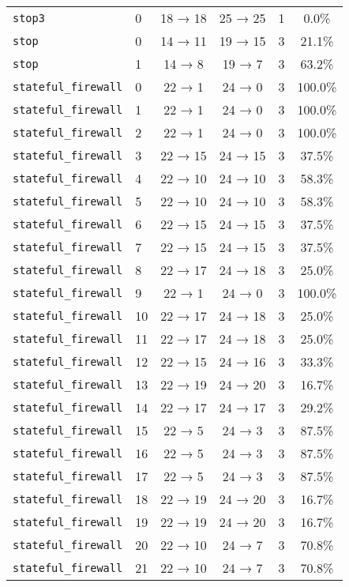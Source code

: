 \begin{tabular}{llcccc}
\texttt{stop3} & 0 & 18 → 18 & 25 → 25 & 1 & 0.0\% \\
\texttt{stop} & 0 & 14 → 11 & 19 → 15 & 3 & 21.1\% \\
\texttt{stop} & 1 & 14 → 8 & 19 → 7 & 3 & 63.2\% \\
\texttt{stateful_firewall} & 0 & 22 → 1 & 24 → 0 & 3 & 100.0\% \\
\texttt{stateful_firewall} & 1 & 22 → 1 & 24 → 0 & 3 & 100.0\% \\
\texttt{stateful_firewall} & 2 & 22 → 1 & 24 → 0 & 3 & 100.0\% \\
\texttt{stateful_firewall} & 3 & 22 → 15 & 24 → 15 & 3 & 37.5\% \\
\texttt{stateful_firewall} & 4 & 22 → 10 & 24 → 10 & 3 & 58.3\% \\
\texttt{stateful_firewall} & 5 & 22 → 10 & 24 → 10 & 3 & 58.3\% \\
\texttt{stateful_firewall} & 6 & 22 → 15 & 24 → 15 & 3 & 37.5\% \\
\texttt{stateful_firewall} & 7 & 22 → 15 & 24 → 15 & 3 & 37.5\% \\
\texttt{stateful_firewall} & 8 & 22 → 17 & 24 → 18 & 3 & 25.0\% \\
\texttt{stateful_firewall} & 9 & 22 → 1 & 24 → 0 & 3 & 100.0\% \\
\texttt{stateful_firewall} & 10 & 22 → 17 & 24 → 18 & 3 & 25.0\% \\
\texttt{stateful_firewall} & 11 & 22 → 17 & 24 → 18 & 3 & 25.0\% \\
\texttt{stateful_firewall} & 12 & 22 → 15 & 24 → 16 & 3 & 33.3\% \\
\texttt{stateful_firewall} & 13 & 22 → 19 & 24 → 20 & 3 & 16.7\% \\
\texttt{stateful_firewall} & 14 & 22 → 17 & 24 → 17 & 3 & 29.2\% \\
\texttt{stateful_firewall} & 15 & 22 → 5 & 24 → 3 & 3 & 87.5\% \\
\texttt{stateful_firewall} & 16 & 22 → 5 & 24 → 3 & 3 & 87.5\% \\
\texttt{stateful_firewall} & 17 & 22 → 5 & 24 → 3 & 3 & 87.5\% \\
\texttt{stateful_firewall} & 18 & 22 → 19 & 24 → 20 & 3 & 16.7\% \\
\texttt{stateful_firewall} & 19 & 22 → 19 & 24 → 20 & 3 & 16.7\% \\
\texttt{stateful_firewall} & 20 & 22 → 10 & 24 → 7 & 3 & 70.8\% \\
\texttt{stateful_firewall} & 21 & 22 → 10 & 24 → 7 & 3 & 70.8\% \\

\end{tabular}
